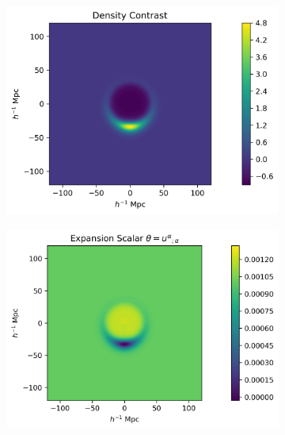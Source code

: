\documentclass[a4paper,12pt]{report}
\begin{document}
\begin{figure}[t]
     \centering
     \begin{subfigure}[b]{0.45\textwidth}
         \centering
         \includegraphics[width=\textwidth]{Density Contrast.png}
         \subcaption{}
     \end{subfigure}
     \hfill
     \begin{subfigure}[b]{0.45\textwidth}
         \centering
         \includegraphics[width=\textwidth]{Expansion Scalar.png}
         \subcaption{}
     \end{subfigure}
     \\
      \centering
      \begin{subfigure}[b]{0.45\textwidth}
          \centering

\end{subfigure}
\end{figure}
\end{document}
